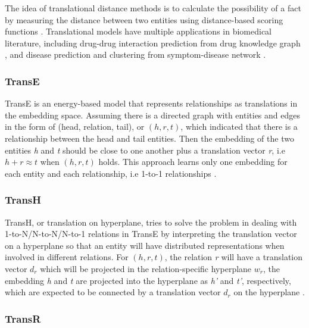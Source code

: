 The idea of translational distance methods is to calculate the possibility of a fact by measuring the distance between two entities using distance-based scoring functions \cite{wang_knowledge_2017}.
Translational models have multiple applications in biomedical literature, including drug-drug interaction prediction from drug knowledge graph \cite{abdelaziz_large-scale_2017, wang_predicting_2017}, and disease prediction and clustering from symptom-disease network \cite{zhao_contextcare:_2017}.

\subsubsection{TransE}

TransE is an energy-based model that represents relationships as translations in the embedding space.
Assuming there is a directed graph with entities and edges in the form of (head, relation, tail), or $(h, r, t)$, which indicated that there is a relationship between the head and tail entities. Then the embedding of the two entities \textit{h} and \textit{t} should be close to one another plus a translation vector \textit{r}, i.e $h + r \approx t$ when $(h, r, t)$ holds. This approach learns only one embedding for each entity and each relationship, i.e 1-to-1 relationships \cite{bordes_translating_2013}.

\subsubsection{TransH}
TransH, or translation on hyperplane, tries to solve the problem in dealing with 1-to-N/N-to-N/N-to-1 relations in TransE by interpreting the translation vector on a hyperplane so that an entity will have distributed representations when involved in different relations.
For $(h, r, t)$, the relation \textit{r} will have a translation vector $d_{r}$ which will be projected in the relation-specific hyperplane $w_{r}$, the embedding \textit{h} and \textit{t} are projected into the hyperplane as \textit{h’} and \textit{t’}, respectively, which are expected to be connected by a translation vector $d_{r}$ on the hyperplane \cite{wang_knowledge_2014}. 

\subsubsection{TransR}

